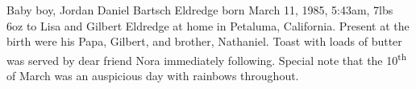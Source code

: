 Baby boy, Jordan Daniel Bartsch Eldredge born March 11, 1985, 5:43am, 7lbs 6oz
to Lisa and Gilbert Eldredge at home in Petaluma, California.  Present at the
birth were his Papa, Gilbert, and brother, Nathaniel.  Toast with loads of
butter was served by dear friend Nora immediately following.  Special note that
the 10\textsuperscript{th} of March was an auspicious day with rainbows
throughout.

